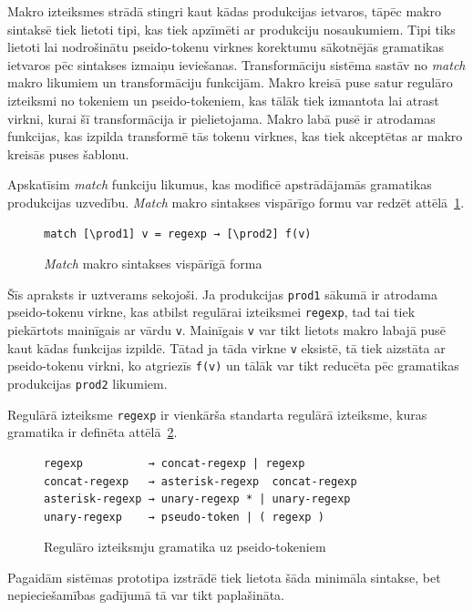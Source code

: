 Makro izteiksmes strādā stingri kaut kādas produkcijas ietvaros, tāpēc makro sintaksē tiek lietoti tipi, kas tiek apzīmēti ar produkciju nosaukumiem. Tipi tiks lietoti lai nodrošinātu pseido-tokenu virknes korektumu sākotnējās gramatikas ietvaros pēc sintakses izmaiņu ieviešanas. Transformāciju sistēma sastāv no \emph{match} makro likumiem un transformāciju funkcijām. Makro kreisā puse satur regulāro izteiksmi no tokeniem un pseido-tokeniem, kas tālāk tiek izmantota lai atrast virkni, kurai šī transformācija ir pielietojama. Makro labā pusē ir atrodamas funkcijas, kas izpilda transformē tās tokenu virknes, kas tiek akceptētas ar makro kreisās puses šablonu.

Apskatīsim \textit{match} funkciju likumus, kas modificē apstrādājamās gramatikas produkcijas uzvedību. \emph{Match} makro sintakses vispārīgo formu var redzēt attēlā~\ref{fig:matchsyntax}.

\begin{figure}[h!]
\begin{verbatim}
match [\prod1] v = regexp → [\prod2] f(v)
\end{verbatim}
\caption{\label{fig:matchsyntax}\emph{Match} makro sintakses vispārīgā forma}
\end{figure}

Šīs apraksts ir uztverams sekojoši. Ja produkcijas \verb|prod1| sākumā ir atrodama pseido-tokenu virkne, kas atbilst regulārai izteiksmei \verb|regexp|, tad tai tiek piekārtots mainīgais ar vārdu \verb|v|. Mainīgais \verb|v| var tikt lietots makro labajā pusē kaut kādas funkcijas izpildē. Tātad ja tāda virkne \verb|v| eksistē, tā tiek aizstāta ar pseido-tokenu virkni, ko atgriezīs \verb|f(v)| un tālāk var tikt reducēta pēc gramatikas produkcijas \verb|prod2| likumiem. 

Regulārā izteiksme \verb|regexp| ir vienkārša standarta regulārā izteiksme, kuras gramatika ir definēta attēlā~\ref{fig:regexpsyntax}.

\begin{figure}[h!]
\begin{verbatim}
regexp          → concat-regexp | regexp
concat-regexp   → asterisk-regexp  concat-regexp
asterisk-regexp → unary-regexp * | unary-regexp
unary-regexp    → pseudo-token | ( regexp )
\end{verbatim}
\caption{\label{fig:regexpsyntax}Regulāro izteiksmju gramatika uz pseido-tokeniem}
\end{figure}

Pagaidām sistēmas prototipa izstrādē tiek lietota šāda minimāla sintakse, bet nepieciešamības gadījumā tā var tikt paplašināta.

